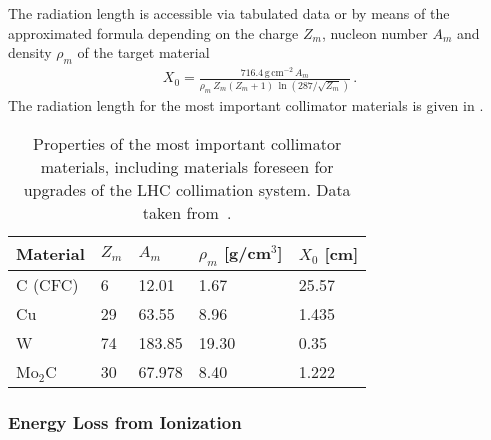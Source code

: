 The radiation length is accessible via tabulated data or by means of the approximated formula depending on the charge $Z_m$, nucleon number $A_m$ and density $\rho_m$ of the target material~\cite{Beringer:1900zz}
%
\begin{align}
  X_0 = \frac{716.4 \, \text{g} \, \text{cm}^{-2} \, A_m}{\rho_m \, Z_m (Z_m+1) \, \ln (287/\sqrt{Z_m})} \, .
\end{align}
%
The radiation length for the most important collimator materials is given in .

\begin{table}[t]
\centering
\caption{Properties of the most important collimator materials, including materials foreseen for upgrades of the LHC collimation system. Data taken from~\cite{IPAC15:TUPTY029}.}
\label{tab:radiation_lengths}
\begin{tabular}{lllll}
\toprule
Material & $Z_m$ & $A_m$  & $\rho_m$ {[}g/cm$^3${]} & $X_0$ {[}cm{]}  \\ \midrule
C (CFC)  & 6     & 12.01  & 1.67                    & 25.57          \\
Cu       & 29    & 63.55  & 8.96                    & 1.435          \\
W        & 74    & 183.85 & 19.30                    & 0.35           \\
Mo$_2$C  & 30    & 67.978 & 8.40                     & 1.222         \\ \bottomrule
\end{tabular}
\end{table}



\subsubsection{Energy Loss from Ionization}

